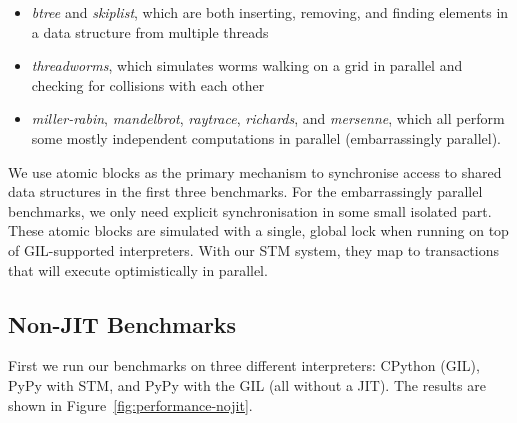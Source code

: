\documentclass{sigplanconf}
\begin{document}
\begin{itemize}
\item \emph{btree} and \emph{skiplist}, which are both inserting,
  removing, and finding elements in a data structure from multiple
  threads
\item \emph{threadworms}, which simulates worms walking on a grid in
  parallel and checking for collisions with each other
\item \emph{miller-rabin}, \emph{mandelbrot}, \emph{raytrace},
  \emph{richards}, and \emph{mersenne}, which all perform some mostly
  independent computations in parallel (embarrassingly parallel).
\end{itemize}

We use atomic blocks as the primary mechanism to synchronise access to
shared data structures in the first three benchmarks. For the
embarrassingly parallel benchmarks, we only need explicit
synchronisation in some small isolated part. These atomic blocks are
simulated with a single, global lock when running on top of
GIL-supported interpreters. With our STM system, they map to
transactions that will execute optimistically in parallel.









\subsection{Non-JIT Benchmarks}
First we run our benchmarks on three different interpreters: CPython
(GIL), PyPy with STM, and PyPy with the GIL (all without a JIT). The
results are shown in Figure~\ref{fig:performance-nojit}.
\end{document}

